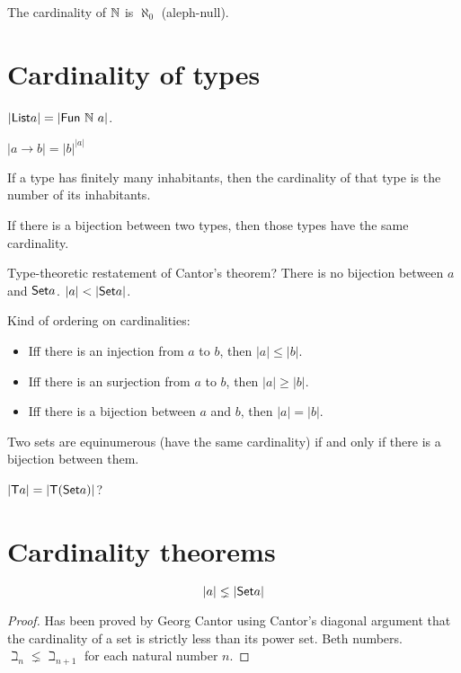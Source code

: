The cardinality of $\mathbb{N}$ is $\aleph_0$ (aleph-null).

\section{Cardinality of types}

$|\textsf{List}{a}| = |\mathsf{Fun}~\mathbb{N}~a|$.

\(|a \to b| = |b|^{|a|}\)

If a type has finitely many inhabitants,
then the cardinality of that type is the number of its inhabitants.

If there is a bijection between two types,
then those types have the same cardinality.

Type-theoretic restatement of Cantor's theorem?
There is no bijection between $a$ and $\textsf{Set}{a}$.
$|a| < |\textsf{Set}{a}|$.

Kind of ordering on cardinalities:
\begin{itemize}
    \item Iff there is an injection from $a$ to $b$, then $|a| \le |b|$.
    \item Iff there is an surjection from $a$ to $b$, then $|a| \ge |b|$.
    \item Iff there is a bijection between $a$ and $b$, then $|a| = |b|$.
\end{itemize}

Two sets are equinumerous (have the same cardinality) if and only if there is a bijection between them.

$|\mathsf{T} a| = |\mathsf{T} (\textsf{Set}{a})|$?

\section{Cardinality theorems}

\begin{mthm}
    \[
        |a| \lneq |\textsf{Set}{a}|
    \]
\begin{proof}
    Has been proved by Georg Cantor using Cantor's diagonal argument
    that the cardinality of a set is strictly less than its power set.
    Beth numbers.
    $\beth_n \lneq \beth_{n+1}$ for each natural number $n$.
\end{proof}
\end{mthm}

